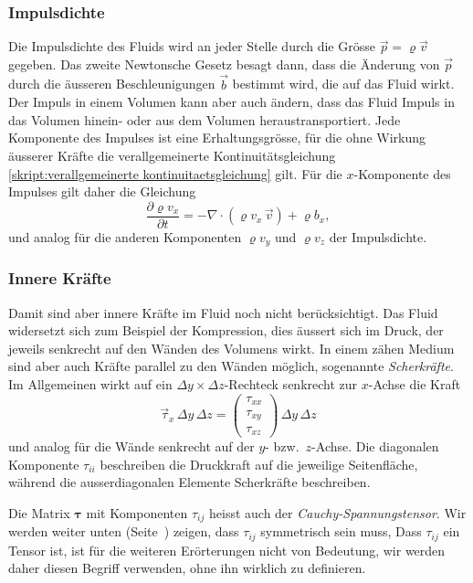 \subsubsection{Impulsdichte}
Die Impulsdichte des Fluids wird an jeder Stelle durch die Grösse
$\vec{p}=\varrho\vec{v}$ gegeben.
Das zweite Newtonsche Gesetz besagt dann, dass die Änderung von $\vec p$
durch die äusseren Beschleunigungen $\vec{b}$ bestimmt wird,
die auf das Fluid wirkt.
Der Impuls in einem Volumen kann aber auch ändern, dass das Fluid Impuls
in das Volumen hinein- oder aus dem Volumen heraustransportiert.
Jede Komponente des Impulses ist eine Erhaltungsgrösse, für die ohne
Wirkung äusserer Kräfte die verallgemeinerte Kontinuitätsgleichung
\eqref{skript:verallgemeinerte kontinuitaetsgleichung}
gilt.
Für die $x$-Komponente des Impulses gilt daher die Gleichung
\[
\frac{\partial \varrho v_x}{\partial t}
=
-\nabla \cdot(\varrho v_x\,\vec{v})
+\varrho b_x,
\]
und analog für die anderen Komponenten $\varrho v_y$ und $\varrho v_z$ 
der Impulsdichte.

\subsubsection{Innere Kräfte}
Damit sind aber innere Kräfte im Fluid noch nicht berücksichtigt.
Das Fluid widersetzt sich zum Beispiel der Kompression, dies äussert
sich im Druck, der jeweils senkrecht auf den Wänden des Volumens wirkt.
In einem zähen Medium sind aber auch Kräfte parallel zu den Wänden
möglich, sogenannte {\em Scherkräfte}.
Im Allgemeinen wirkt auf ein $\Delta y\times\Delta z$-Rechteck senkrecht
zur $x$-Achse die Kraft
\[
\vec{\tau}_x
\,\Delta y\,\Delta z
=
\begin{pmatrix}
\tau_{xx}\\
\tau_{xy}\\
\tau_{xz}
\end{pmatrix}
\,\Delta y\,\Delta z
\]
und analog für die Wände senkrecht auf der $y$- bzw.~$z$-Achse.
Die diagonalen Komponente $\tau_{ii}$ beschreiben die Druckkraft
auf die jeweilige Seitenfläche, während die ausserdiagonalen Elemente
Scherkräfte beschreiben.

Die Matrix $\bm{\tau}$ mit Komponenten $\tau_{ij}$ heisst auch der
{\em Cauchy-Spannungstensor}.
Wir werden weiter unten (Seite~\pageref{skript:spannungstensor symmetrisch})
zeigen, dass $\tau_{ij}$ symmetrisch sein muss,
Dass $\tau_{ij}$ ein Tensor ist, ist für die weiteren Erörterungen nicht
von Bedeutung, wir werden daher diesen Begriff verwenden, ohne ihn wirklich
zu definieren.

